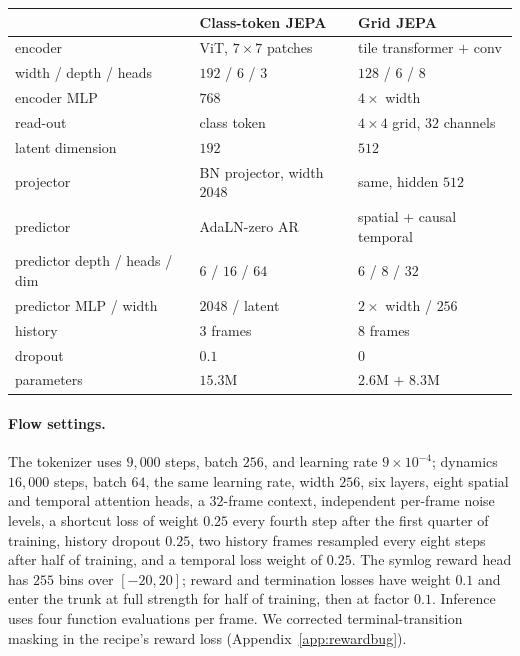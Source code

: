\begin{center}
{
\begin{tabular}{lll}
\toprule
& Class-token JEPA & Grid JEPA \\
\midrule
encoder            & ViT, $7\times7$ patches           & tile transformer $+$ conv \\
width / depth / heads & $192$ / $6$ / $3$              & $128$ / $6$ / $8$ \\
encoder MLP        & $768$                              & $4\times$ width \\
read-out           & class token                        & $4\times4$ grid, $32$ channels \\
latent dimension   & $192$                              & $512$ \\
projector          & BN projector, width $2048$      & same, hidden $512$ \\
predictor          & AdaLN-zero AR          & spatial + causal temporal \\
predictor depth / heads / dim & $6$ / $16$ / $64$  & $6$ / $8$ / $32$ \\
predictor MLP / width & $2048$ / latent                 & $2\times$ width / $256$ \\
history            & $3$ frames                         & $8$ frames \\
dropout            & $0.1$                              & $0$ \\
parameters         & $15.3$M                            & $2.6$M $+$ $8.3$M \\
\bottomrule
\end{tabular}}
\end{center}

\paragraph{Flow settings.}
The tokenizer uses $9{,}000$ steps, batch $256$, and learning rate $9\times10^{-4}$; dynamics
$16{,}000$ steps, batch $64$, the same learning rate, width $256$, six layers, eight spatial and
temporal attention heads, a $32$-frame context, independent per-frame noise levels, a shortcut loss of
weight $0.25$ every fourth step after the first quarter of training, history dropout $0.25$, two
history frames resampled every eight steps after half of training, and a temporal loss weight of
$0.25$. The symlog reward head has $255$ bins over $[-20,20]$; reward and termination losses have
weight $0.1$ and enter the trunk at full strength for half of training, then at factor $0.1$.
Inference uses four function evaluations per frame. We corrected terminal-transition masking in the
recipe's reward loss (Appendix~\ref{app:rewardbug}).

